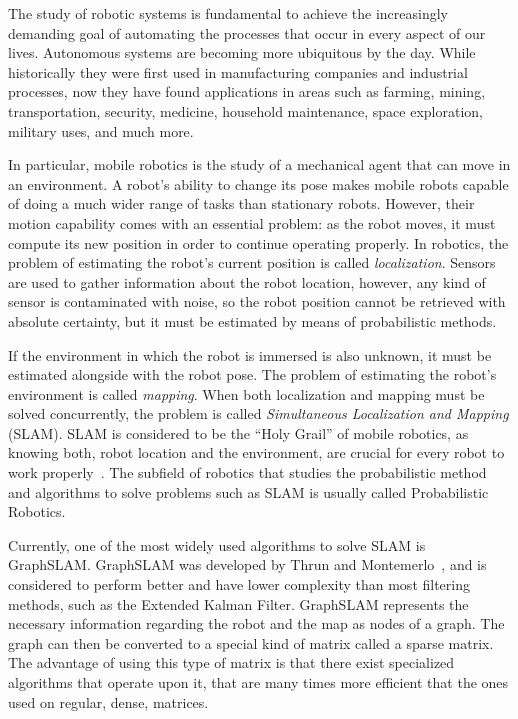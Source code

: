 The study of robotic systems is fundamental to achieve the increasingly demanding goal of automating the processes that occur in every aspect of our lives. Autonomous systems are becoming more ubiquitous by the day. While historically they were first used in manufacturing companies and industrial processes, now they have found applications in areas such as farming, mining, transportation, security, medicine, household maintenance, space exploration, military uses, and much more.

In particular, mobile robotics is the study of a mechanical agent that can move in an environment. A robot's ability to change its pose makes mobile robots capable of doing a much wider range of tasks than stationary robots. However, their motion capability comes with an essential problem: as the robot moves, it must compute its new position in order to continue operating properly. In robotics, the problem of estimating the robot's current position is called \textit{localization}. Sensors are used to gather information about the robot location, however, any kind of sensor is contaminated with noise, so the robot position cannot be retrieved with absolute certainty, but it must be estimated by means of probabilistic methods.  


If the environment in which the robot is immersed is also unknown, it must be estimated alongside with the robot pose. The problem of estimating the robot's environment is called \textit{mapping}. When both localization and mapping must be solved concurrently, the problem is called \textit{Simultaneous Localization and Mapping} (SLAM). SLAM is considered to be the ``Holy Grail'' of mobile robotics, as knowing both, robot location and the environment, are crucial for every robot to work properly~\cite{holygrail}. The subfield of robotics that studies the probabilistic method and algorithms to solve problems such as SLAM is usually called Probabilistic Robotics.

Currently, one of the most widely used algorithms to solve SLAM is GraphSLAM. GraphSLAM was developed by Thrun and Montemerlo~\cite{graphslam}, and is considered to perform better and have lower complexity than most filtering methods, such as the Extended Kalman Filter. GraphSLAM represents the necessary information regarding the robot and the map as nodes of a graph. The graph can then be converted to a special kind of matrix called a sparse matrix. The advantage of using this type of matrix is that there exist specialized algorithms that operate upon it, that are many times more efficient that the ones used on regular, dense, matrices. 


